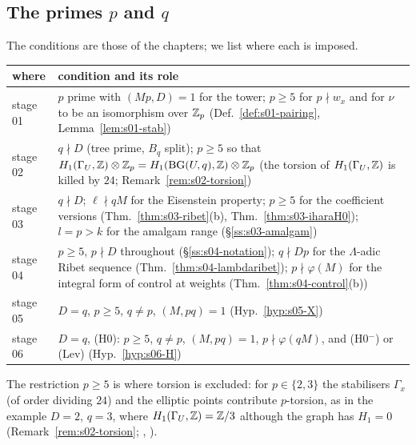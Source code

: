 \subsection{The primes \texorpdfstring{$p$}{p} and \texorpdfstring{$q$}{q}}\label{ss:s00-primes}
The conditions are those of the chapters; we list where each is imposed.
\begin{center}\small
\begin{tabular}{@{}p{}p{}@{}}\toprule
where & condition and its role\\\midrule
stage 01 & $p$ prime with $(Mp,D)=1$ for the tower; $p\ge5$ for $p\nmid w_x$ and for $\nu$ to be an isomorphism over $\mathbb{Z}_p$ (Def.~\ref{def:s01-pairing}, Lemma~\ref{lem:s01-stab})\\
stage 02 & $q\nmid D$ (tree prime, $B_q$ split); $p\ge5$ so that $H_1(\Gamma_U,\mathbb{Z})\otimes\mathbb{Z}_p=H_1(\mathrm{BG}(U,q),\mathbb{Z})\otimes\mathbb{Z}_p$ (the torsion of $H_1(\Gamma_U,\mathbb{Z})$ is killed by $24$; Remark~\ref{rem:s02-torsion})\\
stage 03 & $q\nmid D$; $\ell\nmid qM$ for the Eisenstein property; $p\ge5$ for the coefficient versions (Thm.~\ref{thm:s03-ribet}(b), Thm.~\ref{thm:s03-iharaH0}); $l=p>k$ for the amalgam range (\S\ref{ss:s03-amalgam})\\
stage 04 & $p\ge5$, $p\nmid D$ throughout (\S\ref{ss:s04-notation}); $q\nmid Dp$ for the $\Lambda$-adic Ribet sequence (Thm.~\ref{thm:s04-lambdaribet}); $p\nmid\varphi(M)$ for the integral form of control at weights (Thm.~\ref{thm:s04-control}(b))\\
stage 05 & $D=q$, $p\ge5$, $q\ne p$, $(M,pq)=1$ (Hyp.~\ref{hyp:s05-X})\\
stage 06 & $D=q$, (H0): $p\ge5$, $q\ne p$, $(M,pq)=1$, $p\nmid\varphi(qM)$, and (H0$^-$) or (Lev) (Hyp.~\ref{hyp:s06-H})\\\bottomrule
\end{tabular}
\end{center}
The restriction $p\ge5$ is where torsion is excluded: for $p\in\{2,3\}$ the stabilisers $\Gamma_x$ (of order dividing $24$) and the
elliptic points contribute $p$-torsion, as in the example $D=2$, $q=3$, where $H_1(\Gamma_U,\mathbb{Z})=\mathbb{Z}/3$ although the graph has $H_1=0$
(Remark~\ref{rem:s02-torsion}; \stcomp, ).
